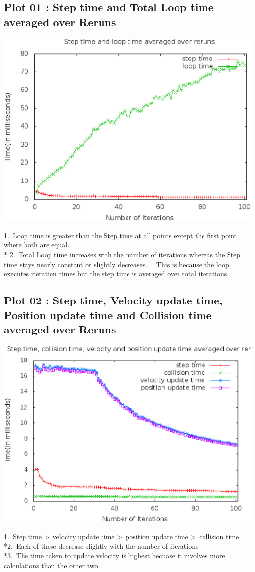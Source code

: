 \documentclass[11pt]{article}
\begin{document}
\subsection{Plot 01 : Step time and Total Loop time averaged over Reruns}
\begin{center}
\includegraphics[scale=0.5]{plot01}
\end{center}
1.\ Loop time is greater than the Step time at all points except the first point where both are equal.
\\* 2.\ Total Loop time increases with the number of iterations whereas the Step time stays nearly constant or slightly decreases. \ \ This is because the loop executes iteration times but the step time is averaged over total iterations.
\subsection{Plot 02 : Step time, Velocity update time, Position update time and Collision time averaged over Reruns}
\begin{center}
\includegraphics[scale=0.5]{plot02}
\end{center}
1.\ Step time \textgreater \ velocity update time \textgreater \ position update time \textgreater \ collision time
\\*2.\ Each of these decrease slightly with the number of iterations
\\*3.\ The time taken to update velocity is highest becuase it involves more calculations than the other two.
\end{document}
